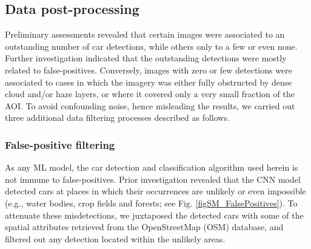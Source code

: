 \documentclass[sn-basic]{sn-jnl}%
\begin{document}


\subsection{Data post-processing} \label{MMS4}

Preliminary assessments revealed that certain images were associated to an outstanding number of car detections, while others only to a few or even none. Further investigation indicated that the outstanding detections were mostly related to false-positives. Conversely, images with zero or few detections were associated to cases in which the imagery was either fully obstructed by dense cloud and/or haze layers, or where it covered only a very small fraction of the AOI. To avoid confounding noise, hence misleading the results, we carried out three additional data filtering processes described as follows.


\subsubsection{False-positive filtering} \label{MMS4-1}

As any ML model, the car detection and classification algorithm used herein is not immune to false-positives. Prior investigation revealed that the CNN model detected cars at places in which their occurrences are unlikely or even impossible (e.g., water bodies, crop fields and forests; see Fig. \ref{figSM_FalsePositives}). To attenuate these misdetections, we juxtaposed the detected cars with some of the spatial attributes retrieved from the OpenStreetMap (OSM) database, and filtered out any detection located within the unlikely areas.
\end{document}
